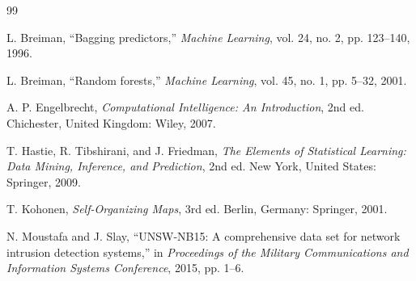 \documentclass[conference]{IEEEtran}
\begin{document}
\begin{thebibliography}{99}

L. Breiman,
``Bagging predictors,''
\textit{Machine Learning}, vol. 24, no. 2, pp. 123--140, 1996.

L. Breiman,
``Random forests,''
\textit{Machine Learning}, vol. 45, no. 1, pp. 5--32, 2001.

A. P. Engelbrecht,
\textit{Computational Intelligence: An Introduction}, 2nd ed.
Chichester, United Kingdom: Wiley, 2007.

T. Hastie, R. Tibshirani, and J. Friedman,
\textit{The Elements of Statistical Learning: Data Mining, Inference, and Prediction}, 2nd ed.
New York, United States: Springer, 2009.

T. Kohonen,
\textit{Self-Organizing Maps}, 3rd ed.
Berlin, Germany: Springer, 2001.

N. Moustafa and J. Slay,
``UNSW-NB15: A comprehensive data set for network intrusion detection systems,''
in \textit{Proceedings of the Military Communications and Information Systems Conference}, 2015, pp. 1--6.

\end{thebibliography}
\end{document}
